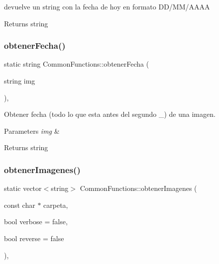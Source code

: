 devuelve un string con la fecha de hoy en formato D\+D/\+M\+M/\+A\+A\+AA 

\begin{DoxyReturn}{Returns}
string 
\end{DoxyReturn}
\mbox{\label{classCommonFunctions_a6b4829d1fab8cd74c15c540cf97fe237}} 
\subsubsection{\texorpdfstring{obtener\+Fecha()}{obtenerFecha()}}
{\footnotesize\ttfamily static string Common\+Functions\+::obtener\+Fecha (\begin{DoxyParamCaption}\item[{string}]{img }\end{DoxyParamCaption})\hspace{0.3cm}{\ttfamily [inline]}, {\ttfamily [static]}}



Obtener fecha (todo lo que esta antes del segundo \+\_\+) de una imagen. 


\begin{DoxyParams}{Parameters}
{\em img} & \\
\hline
\end{DoxyParams}
\begin{DoxyReturn}{Returns}
string 
\end{DoxyReturn}
\mbox{\label{classCommonFunctions_a1c75d9fe2327ecfa13a4a1078e00c644}} 
\subsubsection{\texorpdfstring{obtener\+Imagenes()}{obtenerImagenes()}}
{\footnotesize\ttfamily static vector$<$string$>$ Common\+Functions\+::obtener\+Imagenes (\begin{DoxyParamCaption}\item[{const char $\ast$}]{carpeta,  }\item[{bool}]{verbose = {\ttfamily false},  }\item[{bool}]{reverse = {\ttfamily false} }\end{DoxyParamCaption})\hspace{0.3cm}{\ttfamily [inline]}, {\ttfamily [static]}}



